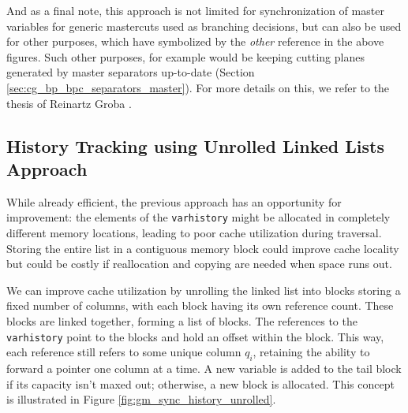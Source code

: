 And as a final note, this approach is not limited for synchronization of master variables for generic mastercuts used as branching decisions, but can also be used for other purposes, which have symbolized by the \textit{other} reference in the above figures. Such other purposes, for example would be keeping cutting planes generated by master separators up-to-date (Section \ref{sec:cg_bp_bpc_separators_master}). For more details on this, we refer to the thesis of Reinartz Groba \cite{reinartzgroba2024todo}.

\subsection{History Tracking using Unrolled Linked Lists Approach}\label{subsec:gm_sync_history_unrolled}
While already efficient, the previous approach has an opportunity for improvement: the elements of the \texttt{varhistory} might be allocated in completely different memory locations, leading to poor cache utilization during traversal. Storing the entire list in a contiguous memory block could improve cache locality but could be costly if reallocation and copying are needed when space runs out.

We can improve cache utilization by unrolling the linked list into blocks storing a fixed number of columns, with each block having its own reference count. These blocks are linked together, forming a list of blocks. The references to the \texttt{varhistory} point to the blocks and hold an offset within the block. This way, each reference still refers to some unique column $q_i$, retaining the ability to forward a pointer one column at a time. A new variable is added to the tail block if its capacity isn't maxed out; otherwise, a new block is allocated. This concept is illustrated in Figure \ref{fig:gm_sync_history_unrolled}.

